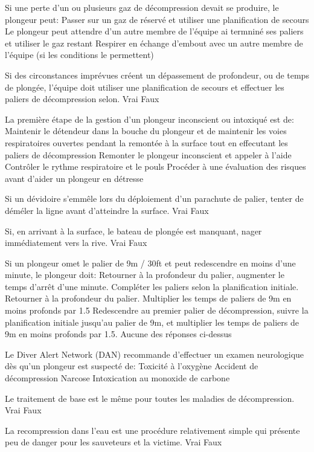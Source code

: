 \documentclass[english,12pt,a4paper]{article}
\begin{document}
\begin{outline}
		\1 Si une perte d'un ou plusieurs gaz de décompression devait se produire, le plongeur peut:
			\2 Passer sur un gaz de réservé et utiliser une planification de secours
			\2 Le plongeur peut attendre d'un autre membre de l'équipe ai termniné ses paliers et utiliser le gaz restant
			\2 Respirer en échange d'embout avec un autre membre de l'équipe (si les conditions le permettent)

		\1 Si des circonstances imprévues créent un dépassement de profondeur, ou de temps de plongée, l'équipe doit utiliser une planification de secours et effectuer les paliers de décompression selon.
			\2 Vrai
			\2 Faux

		\1 La première étape de la gestion d'un plongeur inconscient ou intoxiqué est de:
			\2 Maintenir le détendeur dans la bouche du plongeur et de maintenir les voies respiratoires ouvertes pendant la remontée à la surface tout en effecutant les paliers de décompression
			\2 Remonter le plongeur inconscient et appeler à l'aide
			\2 Contrôler le rythme respiratoire et le pouls
			\2 Procéder à une évaluation des risques avant d'aider un plongeur en détresse

		\1 Si un dévidoire s'emmêle lors du déploiement d'un parachute de palier, tenter de déméler la ligne avant d'atteindre la surface.
			\2 Vrai
			\2 Faux

		\1 Si, en arrivant à la surface, le bateau de plongée est manquant, nager immédiatement vers la rive.
			\2 Vrai
			\2 Faux

		\1 Si un plongeur omet le palier de 9m / 30ft et peut redescendre en moins d'une minute, le plongeur doit:
			\2 Retourner à la profondeur du palier, augmenter le temps d'arrêt d'une minute. Compléter les paliers selon la planification initiale.
			\2 Retourner à la profondeur du palier. Multiplier les temps de paliers de 9m en moins profonds par 1.5
			\2 Redescendre au premier palier de décompression, suivre la planification initiale jusqu'au palier de 9m, et multiplier les temps de paliers de 9m en moins profonds par 1.5.
			\2 Aucune des réponses ci-dessus

		\1 Le Diver Alert Network (DAN) recommande d'effectuer un examen neurologique dès qu'un plongeur est suspecté de:
			\2 Toxicité à l'oxygène
			\2 Accident de décompression
			\2 Narcose
			\2 Intoxication au monoxide de carbone

		\1 Le traitement de base est le même pour toutes les maladies de décompression.
			\2 Vrai
			\2 Faux

		\1 La recompression dans l'eau est une procédure relativement simple qui présente peu de danger pour les sauveteurs et la victime.
			\2 Vrai
			\2 Faux
	\end{outline}
	\pagebreak
\end{document}
